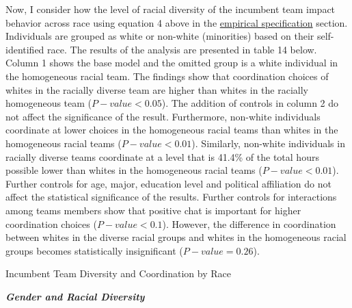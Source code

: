 \noindent Now, I consider how the level of racial diversity of the incumbent team impact behavior across race using equation 4 above in the \hyperref[subsec:Specification]{empirical specification} section. Individuals are grouped as white or non-white (minorities) based on their self-identified race. The results of the analysis are presented in table 14 below. Column 1 shows the base model and the omitted group is a white individual in the homogeneous racial team. The findings show that coordination choices of whites in the racially diverse team are higher than whites in the racially homogeneous team ($P-value<0.05$). The addition of controls in column 2 do not affect the significance of the result. Furthermore, non-white individuals coordinate at lower choices in  the homogeneous racial teams than whites in the homogeneous racial teams ($P-value<0.01$). Similarly, non-white individuals in racially diverse teams coordinate at a level that is 41.4\% of the total hours possible lower than whites in the homogeneous racial teams ($P-value<0.01$). Further controls for age, major, education level and political affiliation do not affect the statistical significance of the results. Further controls for interactions among teams members show that positive chat is important for higher coordination choices ($P-value<0.1$). However, the difference in coordination between whites in the diverse racial groups and whites in the homogeneous racial groups becomes statistically insignificant ($P-value=0.26$). 

\begin{table}[H]
 \captionsetup{justification=raggedright,singlelinecheck=false}
\caption{Incumbent Team Diversity and Coordination by Race } \label{tab:table8}
    \begin{center}
        
    \end{center}
\end{table}

 \noindent\textbf{\textit{Gender and Racial Diversity}}

